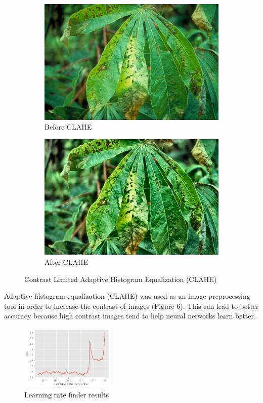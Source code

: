\documentclass{article}
\begin{document}
\begin{figure}
\centering
\begin{subfigure}{}
  \centering
  \includegraphics[width=.7\linewidth]{cassavabb.png}
  \caption{Before CLAHE}
  \label{fig:sub1}
\end{subfigure}%
\begin{subfigure}{}
  \centering
  \includegraphics[width=.7\linewidth]{cassavabb_clahe.png}
  \caption{After CLAHE}
  \label{fig:sub2}
\end{subfigure}
\caption{Contrast Limited Adaptive Histogram Equalization (CLAHE)}
\label{fig:test}
\end{figure}

Adaptive histogram equalization (CLAHE) was used as an image preprocessing tool in order to increase the contrast of images (Figure 6). This can lead to better accuracy because high contrast images tend to help neural networks learn better.

\begin{figure}[!htb]
    \centering
    \includegraphics[width=0.4\textwidth]{index2.png}
    \caption{Learning rate finder results}
    \label{CBB}
\end{figure}
\end{document}
